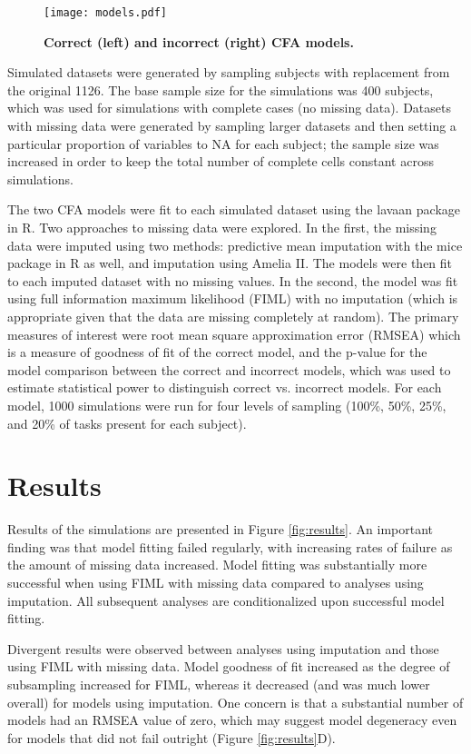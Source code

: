 \documentclass[11pt, oneside]{article}   	%
\begin{document}
\begin{figure}[!h]
\caption{\textbf{Correct (left) and incorrect (right) CFA models.}}
\centering
\texttt{[image: models.pdf]}
\label{fig:models}
\end{figure}

Simulated datasets were generated by sampling subjects with replacement from the original 1126.  The base sample size for the simulations was 400 subjects, which was used for simulations with complete cases (no missing data).  Datasets with missing data were generated by sampling larger datasets and then setting a particular proportion of variables to NA for each subject; the sample size was increased in order to keep the total number of complete cells constant across simulations.  

The two CFA models were fit to each simulated dataset using the lavaan package in R. Two approaches to missing data were explored.  In the first, the missing data were imputed using two methods: predictive mean imputation with the mice package in R as well, and imputation using Amelia II.  The models were then fit to each imputed dataset with no missing values.  In the second, the model was fit using full information maximum likelihood (FIML) with no imputation (which is appropriate given that the data are missing completely at random).  The primary measures of interest were root mean square approximation error (RMSEA) which is a measure of goodness of fit of the correct model, and the p-value for the model comparison between the correct and incorrect models, which was used to estimate statistical power to distinguish correct vs. incorrect models.  For each model, 1000 simulations were run for four levels of sampling (100\%, 50\%, 25\%, and 20\% of tasks present for each subject).  

\section{Results}

Results of the simulations are presented in Figure \ref{fig:results}.  An important finding was that model fitting failed regularly, with increasing rates of failure as the amount of missing data increased.  Model fitting was substantially more successful when using FIML with missing data compared to analyses using imputation.  All subsequent analyses are conditionalized upon successful model fitting.

Divergent results were observed between analyses using imputation and those using FIML with missing data.  Model goodness of fit increased as the degree of subsampling increased for FIML, whereas it decreased (and was much lower overall) for models using imputation.  One concern is that a substantial number of models had an RMSEA value of zero, which may suggest model degeneracy even for models that did not fail outright (Figure \ref{fig:results}D).  
\end{document}
